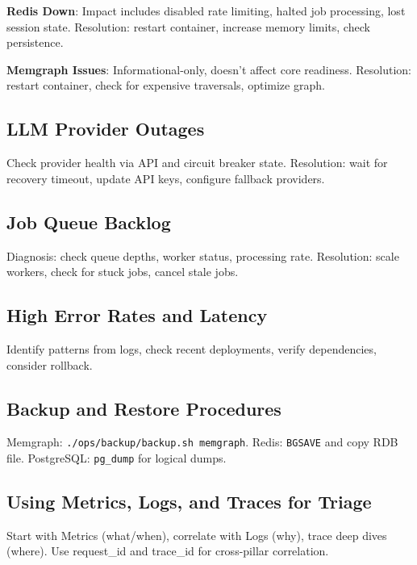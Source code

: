 \documentclass[a4paper,twoside]{sapthesis}
\begin{document}
\textbf{Redis Down}: Impact includes disabled rate limiting, halted job processing, lost session state. Resolution: restart container, increase memory limits, check persistence.

\textbf{Memgraph Issues}: Informational-only, doesn't affect core readiness. Resolution: restart container, check for expensive traversals, optimize graph.

\subsection{LLM Provider Outages}

Check provider health via API and circuit breaker state. Resolution: wait for recovery timeout, update API keys, configure fallback providers.

\subsection{Job Queue Backlog}

Diagnosis: check queue depths, worker status, processing rate. Resolution: scale workers, check for stuck jobs, cancel stale jobs.

\subsection{High Error Rates and Latency}

Identify patterns from logs, check recent deployments, verify dependencies, consider rollback.

\subsection{Backup and Restore Procedures}

Memgraph: \texttt{./ops/backup/backup.sh memgraph}. Redis: \texttt{BGSAVE} and copy RDB file. PostgreSQL: \texttt{pg\_dump} for logical dumps.

\subsection{Using Metrics, Logs, and Traces for Triage}

Start with Metrics (what/when), correlate with Logs (why), trace deep dives (where). Use request\_id and trace\_id for cross-pillar correlation.


\end{document}
